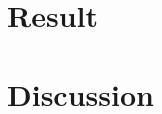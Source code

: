 \documentclass[12pt, oneside]{article}
\begin{document}
\section{Result}\label{sec:result}

\section{Discussion}\label{sec:disc}


%
%
\end{document}
